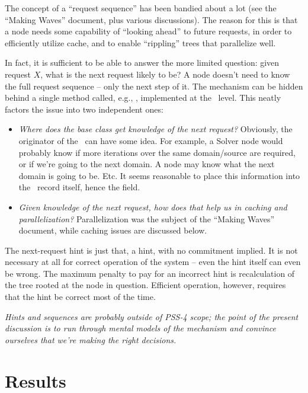 \documentclass[10pt]{article}
\begin{document}
  The concept of a ``request sequence'' has been bandied about a lot (see the
  ``Making Waves'' document, plus various discussions). The reason for this is
  that a node needs some capability of ``looking ahead'' to future requests, in
  order to efficiently utilize cache, and to enable ``rippling'' trees that
  parallelize well.

  In fact, it is sufficient to be able to answer the more limited question:
  given request $X$, what is the next request likely to be? A node doesn't 
  need to know the full request sequence -- only the next step of it. The
  mechanism can be hidden behind a single method called, e.g.,
  , implemented at the \Node\ level. This neatly
  factors the issue into two independent ones:

  \begin{itemize}
  
  \item {\em Where does the base  class get knowledge of the
    next request?} Obviously, the originator of the \Request\ can have some
    idea.  For example, a Solver node would probably know if more iterations
    over the same domain/source are required, or if we're going to the next
    domain. A  node may know what the next domain is going to be. Etc. It
    seems reasonable to place this information into the \Request\ record
    itself, hence the  field.

  \item {\em Given knowledge of the next request, how does that help us in
    caching and parallelization?} Parallelization was the subject of the
    ``Making Waves'' document, while caching issues are discussed below.

  \end{itemize}
  
  The next-request hint is just that, a hint, with no commitment implied. It is
  not necessary at all for correct operation of the system -- even the hint
  itself can even be wrong. The maximum penalty to pay for an incorrect hint is
  recalculation of the tree rooted at the node in question. Efficient
  operation, however, requires that the hint be correct most of the time.

  {\em Hints and sequences are probably outside of PSS-4 scope; the point of
  the present discussion is to run through mental models of the mechanism and
  convince ourselves that we're making the right decisions.}

\section{Results}
\end{document}
